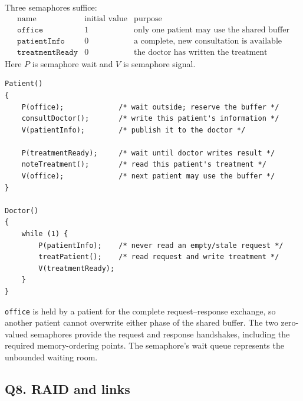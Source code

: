 Three semaphores suffice:
\[
\begin{array}{c|c|l}
\mbox{name} & \mbox{initial value} & \mbox{purpose}\\ \hline
\texttt{office} & 1 & \mbox{only one patient may use the shared buffer}\\
\texttt{patientInfo} & 0 & \mbox{a complete, new consultation is available}\\
\texttt{treatmentReady} & 0 & \mbox{the doctor has written the treatment}
\end{array}
\]
Here \(P\) is semaphore wait and \(V\) is semaphore signal.

\begin{verbatim}
Patient()
{
    P(office);             /* wait outside; reserve the buffer */
    consultDoctor();       /* write this patient's information */
    V(patientInfo);        /* publish it to the doctor */

    P(treatmentReady);     /* wait until doctor writes result */
    noteTreatment();       /* read this patient's treatment */
    V(office);             /* next patient may use the buffer */
}

Doctor()
{
    while (1) {
        P(patientInfo);    /* never read an empty/stale request */
        treatPatient();    /* read request and write treatment */
        V(treatmentReady);
    }
}
\end{verbatim}

\texttt{office} is held by a patient for the complete request--response
exchange, so another patient cannot overwrite either phase of the shared
buffer.  The two zero-valued semaphores provide the request and response
handshakes, including the required memory-ordering points.  The semaphore's
wait queue represents the unbounded waiting room.

\subsection*{Q8. RAID and links}

